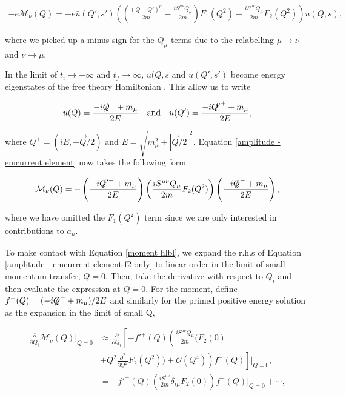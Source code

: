 \documentclass{article}
\numberwithin{equation}{section} %
\begin{document}
\begin{equation}
\begin{split}
-e\mathcal{M}_\nu(Q)= -e\bar{u}(Q',s')\left( \left( \frac{(Q+Q')^\mu }{2m} - \frac{iS^{\mu\nu}Q_\mu}{2m} \right) F_1(Q^2) - \frac{iS^{\mu\nu}Q_\mu}{2m}F_2(Q^2) \right)u(Q,s),
\end{split}
\label{amplitude - emcurrent element}
\end{equation}

\noindent where we picked up a minus sign for the $Q_\mu$ terms due to the relabelling $\mu\rightarrow\nu$ and $\nu\rightarrow\mu$.

In the limit of $t_i \rightarrow -\infty$ and $t_f \rightarrow \infty$, $u(Q,s$ and $\bar{u}(Q',s')$ become energy eigenstates of the free theory Hamiltonian \cite{tong}. This allow us to write

\begin{equation}
u(Q) = \frac{-i\slashed{Q}^-+m_\mu}{2E} \quad \mathrm{and} \quad \bar{u}(Q') = \frac{-i\slashed{Q'}^++m_\mu}{2E},
\end{equation}

\noindent where $Q^\pm = (iE,\pm \vec{Q}/2)$ and $E=\sqrt{m_\mu^2 + |\vec{Q}/2|^2}$. Equation \ref{amplitude - emcurrent element} now takes the following form

\begin{equation}
\mathcal{M}_\nu(Q) = -\left(\frac{-i\slashed{Q'}^++m_\mu}{2E}\right)\left( \frac{iS^{\mu\nu}Q_\mu}{2m}F_2(Q^2) \right)\left(\frac{-i\slashed{Q}^-+m_\mu}{2E}\right),
\label{amplitude - emcurrent element f2 only}
\end{equation}

\noindent where we have omitted the $F_1(Q^2)$ term since we are only interested in contributions to $a_\mu$.

To make contact with Equation \ref{moment hlbl}, we expand the r.h.s of Equation \ref{amplitude - emcurrent element f2 only} to linear order in the limit of small momentum transfer, $Q=0$. Then, take the derivative with respect to $Q_i$ and then evaluate the expression at $Q=0$. For the moment, define $f^{-}(Q) = (-i\slashed Q^{-} + m_\mu)/2E$ and similarly for the primed positive energy solution as the expansion in the limit of small Q,

\begin{equation}
\begin{split}
\frac{\partial}{\partial Q_i} \mathcal{M}_\nu(Q)\bigg\vert_{Q=0} &\approx \frac{\partial}{\partial Q_i}\left[-f'^+(Q)\left( \frac{iS^{\mu\nu}Q_\mu}{2m}(F_2(0) \right.\right. \\
& \left. \left. + Q^2\frac{\partial^2}{\partial Q^2}F_2(Q^2)) + \mathcal{O}(Q^4) \right)f^-(Q) \right]\bigg\vert_{Q=0},\\
&= -f'^+(Q)\left( \frac{iS^{\mu\nu}}{2m}\delta_{i\mu}F_2(0)\right)f^-(Q)\bigg\vert_{Q=0} + \cdots,\\
\end{split}
\label{moment - f2}
\end{equation}
\end{document}
